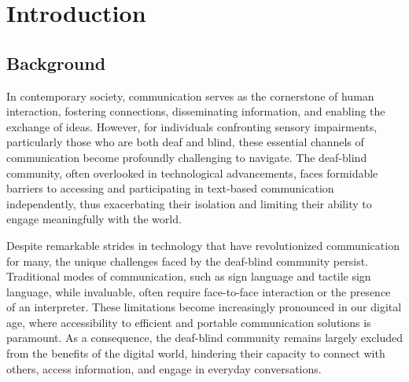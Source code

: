 \documentclass[12pt,a4paper]{report}
\begin{document}
\renewcommand{\baselinestretch}{1.5}



\clearpage
\setcounter{page}{1}
\pagestyle{fancy}

\chapter{Introduction}
\par
\section{Background}
In contemporary society, communication serves as the cornerstone of human interaction, fostering connections, disseminating information, and enabling the exchange of ideas. However, for individuals confronting sensory impairments, particularly those who are both deaf and blind, these essential channels of communication become profoundly challenging to navigate. The deaf-blind community, often overlooked in technological advancements, faces formidable barriers to accessing and participating in text-based communication independently, thus exacerbating their isolation and limiting their ability to engage meaningfully with the world.

Despite remarkable strides in technology that have revolutionized communication for many, the unique challenges faced by the deaf-blind community persist. Traditional modes of communication, such as sign language and tactile sign language, while invaluable, often require face-to-face interaction or the presence of an interpreter. These limitations become increasingly pronounced in our digital age, where accessibility to efficient and portable communication solutions is paramount. As a consequence, the deaf-blind community remains largely excluded from the benefits of the digital world, hindering their capacity to connect with others, access information, and engage in everyday conversations.
\end{document}
